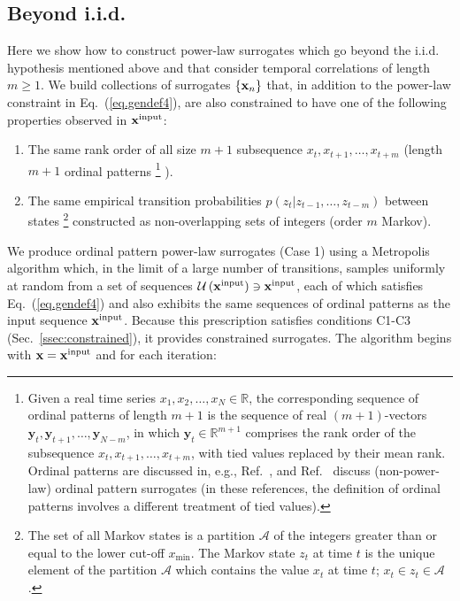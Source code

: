 \documentclass[%
prx,
reprint,
superscriptaddress,
nofootinbib,
 amsmath,amssymb,
 aps,
floatfix,
]{revtex4-2}
\newcommand{\xin}{{{\bf x}^{\text{input}}}}
\begin{document}
\subsection{Beyond i.i.d.} \label{ssec:markov}
 Here we show how to construct power-law surrogates which go beyond the i.i.d. hypothesis mentioned above and that consider temporal correlations of length $m \geq 1$. We build collections of surrogates $\{{\bf x}_n\}$ that, in addition to the power-law constraint in Eq.~(\ref{eq.gendef4}), are also constrained to have one of the following properties observed in $\xin$:
\begin{enumerate}
    \item The same rank order of all size $m + 1$ subsequence $x_t, x_{t + 1}, \ldots, x_{t + m}$ (length $m + 1$ ordinal patterns%
    \footnote{Given a real time series $x_1, x_2, \ldots, x_N \in \mathbb{R}$, the corresponding sequence of ordinal patterns of length $m + 1$ is the sequence of real $(m + 1)$-vectors $\bm{y}_t, {\bm{y}_{t+1}}, \ldots, \bm{y}_{N - m}$, in which $\bm{y}_t \in \mathbb{R}^{m + 1}$ comprises the rank order of the subsequence $x_t, x_{t + 1}, \ldots, x_{t + m}$, with tied values replaced by their mean rank. Ordinal patterns are discussed in, e.g., Ref.~\cite{bandt2002permutation,amigo2007true,amigo2010permutation}, and Ref.~\cite{mccullough2017regenerating,hirata2019surrogate} discuss (non-power-law) ordinal pattern surrogates (in these references, the definition of ordinal patterns involves a different treatment of tied values).%
    }%
    ).
    \item The same empirical transition probabilities $p(z_{t}|z_{t-1}, \ldots, z_{t-m})$ between states%
    \footnote{The set of all Markov states is a partition $\mathcal{A}$ of the integers greater than or equal to the lower cut-off $x_{\min}$. The Markov state $z_t$ at time $t$ is the unique element of the partition $\mathcal{A}$ which contains the value $x_t$ at time $t$; $x_t \in z_t \in \mathcal{A}$.} 
    constructed as non-overlapping sets of integers (order $m$ Markov).
\end{enumerate}
%
\color{black}%
%
We produce ordinal pattern power-law surrogates (Case 1) using a Metropolis algorithm which, in the limit of a large number of transitions, samples uniformly at random from a set of sequences $\mathcal{U}\left(\xin\right) \ni \xin$, each of which satisfies Eq.~(\ref{eq.gendef4}) and also exhibits the same sequences of ordinal patterns as the input sequence $\xin$. Because this prescription satisfies conditions C1-C3 (Sec.~\ref{ssec:constrained}), it provides constrained surrogates. The algorithm begins with ${\bf x}= \xin$ and for each iteration:
\end{document}
